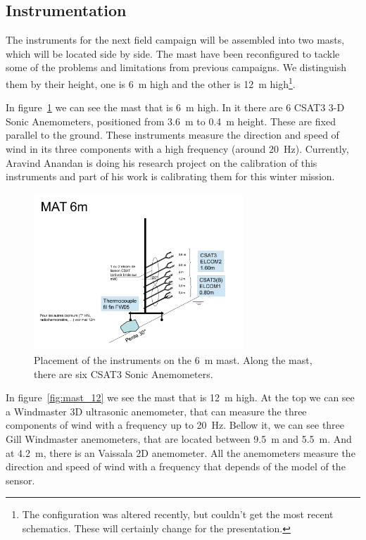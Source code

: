 \documentclass[a4paper,12pt]{article}
\begin{document}
\subsection{Instrumentation} \label{instrumentation}
The instruments for the next field campaign will be assembled into two masts, which will be located side by side. The mast have been reconfigured to tackle some of the problems and limitations from previous campaigns. We distinguish them by their height, one is 6~m high and the other is 12~m high\footnote{The configuration was altered recently, but couldn't get the most recent schematics. These will certainly change for the presentation.}. 

In figure~\ref{fig:mast_6} we can see the mast that is 6~m high. In it there are 6 CSAT3 3-D Sonic Anemometers, positioned from 3.6~m to 0.4~m height. These are fixed parallel to the ground. These instruments measure the direction and speed of wind in its three components with a high frequency (around 20~Hz). Currently, Aravind Anandan is doing his research project on the calibration of this instruments and part of his work is calibrating them for this winter mission.

\begin{figure}[!ht]
  \begin{center}
  \includegraphics[width=0.7\textwidth]{fig/0001.jpg}
  \caption{Placement of the instruments on the 6~m mast. Along the mast, there are six CSAT3 Sonic Anemometers.}
  \label{fig:mast_6}
  \end{center}
\end{figure}

In figure~\ref{fig:mast_12} we see the mast that is 12~m high. At the top we can see a Windmaster 3D ultrasonic anemometer, that can measure the three components of wind with a frequency up to 20~Hz. Bellow it, we can see three Gill Windmaster anemometers, that are located between 9.5~m and 5.5~m. And at 4.2~m, there is an Vaissala 2D anemometer.  All the anemometers measure the direction and speed of wind with a frequency that depends of the model of the sensor. 
\end{document}

